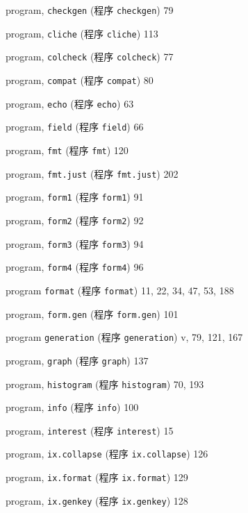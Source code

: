 \begin{multicols}{3}
\hangindent=3pc  program, \verb'checkgen' (程序 \verb'checkgen') 79

\hangindent=3pc  program, \verb'cliche' (程序 \verb'cliche') 113

\hangindent=3pc  program, \verb'colcheck' (程序 \verb'colcheck') 77

\hangindent=3pc  program, \verb'compat' (程序 \verb'compat') 80

\hangindent=3pc  program, \verb'echo' (程序 \verb'echo') 63

\hangindent=3pc  program, \verb'field' (程序 \verb'field') 66

\hangindent=3pc  program, \verb'fmt' (程序 \verb'fmt') 120

\hangindent=3pc  program, \verb'fmt.just' (程序 \verb'fmt.just')
202

\hangindent=3pc  program, \verb'form1' (程序 \verb'form1') 91

\hangindent=3pc  program, \verb'form2' (程序 \verb'form2') 92

\hangindent=3pc  program, \verb'form3' (程序 \verb'form3') 94

\hangindent=3pc  program, \verb'form4' (程序 \verb'form4') 96

\hangindent=3pc  program \verb'format' (程序 \verb'format')
11, 22, 34, 47, 53, 188

\hangindent=3pc  program, \verb'form.gen' (程序 \verb'form.gen') 101

\hangindent=3pc  program \verb'generation' (程序 \verb'generation')
v, 79, 121, 167

\hangindent=3pc  program, \verb'graph' (程序 \verb'graph') 137

\hangindent=3pc  program, \verb'histogram' (程序 \verb'histogram')
70, 193

\hangindent=3pc  program, \verb'info' (程序 \verb'info') 100

\hangindent=3pc  program, \verb'interest' (程序 \verb'interest') 15

\hangindent=3pc  program, \verb'ix.collapse' (程序
\verb'ix.collapse') 126

\hangindent=3pc  program, \verb'ix.format' (程序 \verb'ix.format')
129

\hangindent=3pc  program, \verb'ix.genkey' (程序 \verb'ix.genkey')
128


\end{multicols}
